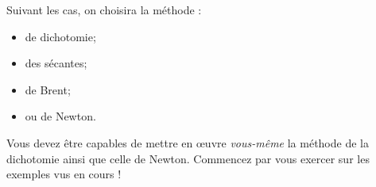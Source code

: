 Suivant les cas, on choisira la méthode :
\begin{itemize}
\item de dichotomie;
\item des sécantes;
\item de Brent;
\item ou de Newton.
\end{itemize}

Vous devez être capables de mettre en {\oe}uvre \emph{vous-même} la méthode de la dichotomie ainsi que celle de Newton. 
Commencez par vous exercer sur les exemples vus en cours ! 

%
%
%




